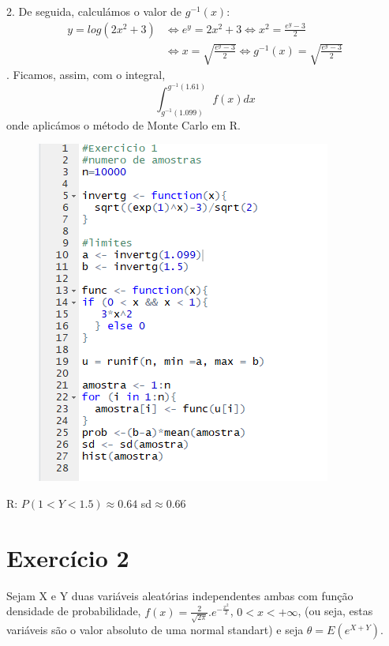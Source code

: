\documentclass{article}
\begin{document}
				2. De seguida, calculámos o valor de $g^{-1}(x)$:
					\begin{equation*}
						\begin{aligned}
							y = log(2x^2 + 3) &\Leftrightarrow e^y = 2x^2 + 3
							\Leftrightarrow x^2 = \frac{e^y - 3}{2}\\ 
							&\Leftrightarrow x = \sqrt{\frac{e^y - 3}{2}}
							\Leftrightarrow g^{-1}(x) = \sqrt{\frac{e^y - 3}{2}}
						\end{aligned}
					\end{equation*}		
				. Ficamos, assim, com o integral,
					\begin{equation*}
						\int^{g^{-1}(1.61)}_{g^{-1}(1.099)} f(x) dx
					\end{equation*}							
					onde aplicámos o método de Monte Carlo em R.
\newpage				
			\begin{figure}[!h]
				\includegraphics[scale=0.40]{ex1}
			\end{figure}	
				\indent R: $P(1< Y < 1.5) \approx 0.64 $ \indent sd$ \approx 0.66$	
		

		
	\section*{Exercício 2}
			\noindent Sejam X e Y duas variáveis aleatórias independentes ambas com função densidade de probabilidade, $f(x) = \frac{2}{\sqrt{2\pi}}.e^{-\frac{x^2}{2}}$, $0 < x < +\infty $, (ou seja, estas variáveis são o valor absoluto de uma normal standart) e seja $\theta = E(e^{X + Y})$.
			
\end{document}
